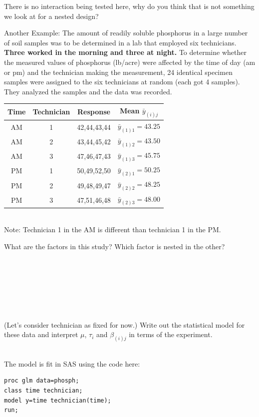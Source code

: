 There is no interaction being tested here, why do you think that is not something we look at for a nested design?

\newpage

\noindent Another Example: The amount of readily soluble phosphorus in a large number of soil samples was to be determined in a lab that employed six technicians.  \textbf{Three worked in the morning and three at night.}  To determine whether the measured values of phosphorus (lb/acre) were affected by the time of day (am or pm) and the technician making the measurement, 24 identical specimen samples were assigned to the six technicians at random (each got 4 samples).  They analyzed the samples and the data was recorded. \\
\begin{center}
\begin{tabular}{cc|c|c}
Time & Technician & Response & Mean $\bar{y}_{(i)j}$\\\hline
AM & 1 &42,44,43,44 & $\bar{y}_{(1)1}=43.25$\\
AM & 2&43,44,45,42& $\bar{y}_{(1)2}=43.50$\\
AM &3&47,46,47,43& $\bar{y}_{(1)3}=45.75$\\
PM &1&50,49,52,50& $\bar{y}_{(2)1}=50.25$\\
PM &2&49,48,49,47& $\bar{y}_{(2)2}=48.25$\\
PM &3&47,51,46,48& $\bar{y}_{(2)3}=48.00$\\
\end{tabular}	
~\\Note: Technician 1 in the AM is different than technician 1 in the PM.
\end{center}

What are the factors in this study?  Which factor is nested in the other?\\~\\~\\~\\~\\~\\~\\~\\

(Let's consider technician as fixed for now.)  Write out the statistical model for these data and interpret $\mu$, $\tau_i$ and $\beta_{(i)j}$ in terms of the experiment.\\~\\

\newpage

The model is fit in SAS using the code here:\\
\begin{small}
\begin{verbatim}
proc glm data=phosph;
class time technician;
model y=time technician(time);
run;
\end{verbatim}
\end{small}

